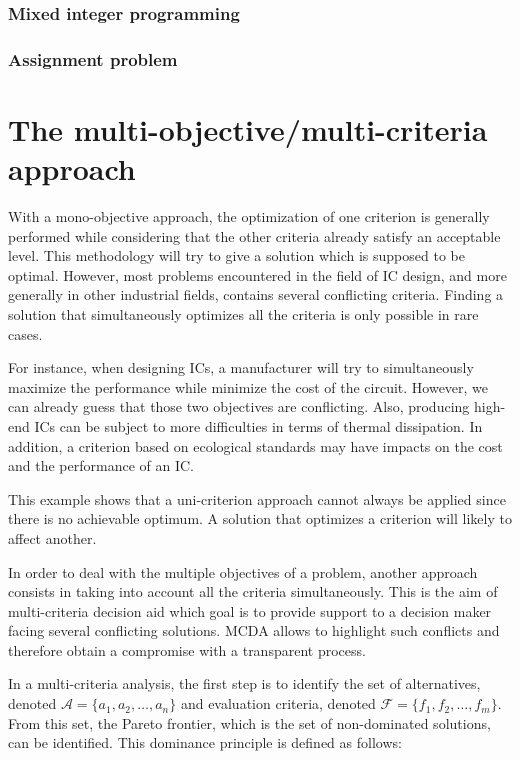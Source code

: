 \subsubsection{Mixed integer programming}


\subsubsection{Assignment problem}


\section{The multi-objective/multi-criteria approach}
\label{sec:rol2.multiobj_approach}

With a mono-objective approach, the optimization of one criterion is generally performed while considering that the other criteria already satisfy an acceptable level. This methodology will try to give a solution which is supposed to be optimal. However, most problems encountered in the field of IC design, and more generally in other industrial fields, contains several conflicting criteria. Finding a solution that simultaneously optimizes all the criteria is only possible in rare cases.

For instance, when designing ICs, a manufacturer will try to simultaneously maximize the performance while minimize the cost of the circuit. However, we can already guess that those two objectives are conflicting. Also, producing high-end ICs can be subject to more difficulties in terms of thermal dissipation. In addition, a criterion based on ecological standards may have impacts on the cost and the performance of an IC.

This example shows that a uni-criterion approach cannot always be applied since there is no achievable optimum. A solution that optimizes a criterion will likely to affect another.

In order to deal with the multiple objectives of a problem, another approach consists in taking into account all the criteria simultaneously. This is the aim of multi-criteria decision aid which goal is to provide support to a decision maker facing several conflicting solutions. MCDA allows to highlight such conflicts and therefore obtain a compromise with a transparent process.


In a multi-criteria analysis, the first step is to identify the set of alternatives, denoted $\mathcal{A}=\{a_1, a_2, \ldots, a_n\}$ and evaluation criteria, denoted $\mathcal{F}=\{f_1,f_2,\ldots, f_m\}$. From this set, the Pareto frontier, which is the set of non-dominated solutions, can be identified. This dominance principle is defined as follows:

